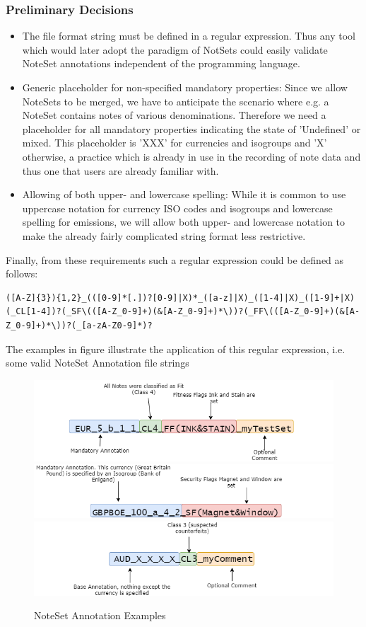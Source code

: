 \subsubsection{Preliminary Decisions}
\begin{itemize}
\item The file format string must be defined in a regular expression. Thus any tool which would later adopt the paradigm of NotSets could easily validate NoteSet annotations independent of the programming language.
\item Generic placeholder for non-specified mandatory properties: Since we allow NoteSets to be merged, we have to anticipate the scenario where e.g. a NoteSet contains notes of various denominations. Therefore we need a placeholder for all mandatory properties indicating the state of 'Undefined' or mixed. This placeholder is 'XXX' for currencies and isogroups and 'X' otherwise, a practice which is already in use in the recording of note data and thus one that users are already familiar with. 
\item Allowing of both upper- and lowercase spelling: While it is common to use uppercase notation for currency ISO codes and isogroups and lowercase spelling for emissions, we will allow both upper- and lowercase notation to make the already fairly complicated string format less restrictive.
\end{itemize}
Finally, from these requirements such a regular expression could be defined as follows:

\begin{center} 
\begin{verbatim}
([A-Z]{3}){1,2}_(([0-9]*[.])?[0-9]|X)*_([a-z]|X)_([1-4]|X)_([1-9]+|X)(_CL[1-4])?(_SF\(([A-Z_0-9]+)(&[A-Z_0-9]+)*\))?(_FF\(([A-Z_0-9]+)(&[A-Z_0-9]+)*\))?(_[a-zA-Z0-9]*)?
\end{verbatim}
\end{center} 
The examples in figure  illustrate the application of this regular expression, i.e. some valid NoteSet Annotation file strings
\begin{figure}[!htb]
  \includegraphics[width=0.49\linewidth]{images/annotation_example1.png}
  \includegraphics[width=0.49\linewidth]{images/annotation_example2.png}
  \includegraphics[width=0.49\linewidth]{images/annotation_example3.png}
  \caption{NoteSet Annotation Examples}\label{fig:ns_example}
\end{figure}

